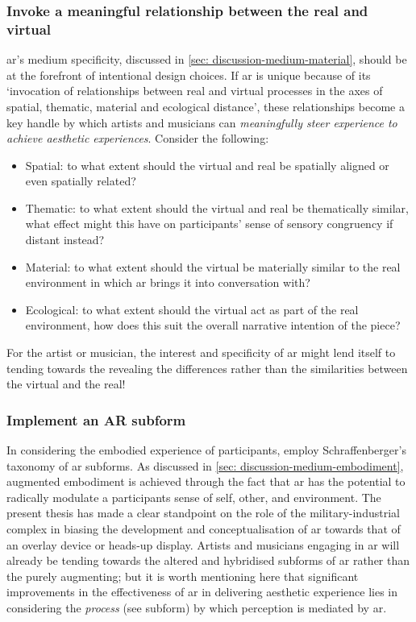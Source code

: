 \subsubsection{Invoke a meaningful relationship between the real and virtual}
\gls{ar}'s medium specificity, discussed in \autoref{sec: discussion-medium-material}, should be at the forefront of intentional design choices. If \gls{ar} is unique because of its `invocation of relationships between real and virtual processes in the axes of spatial, thematic, material and ecological distance', these relationships become a key handle by which artists and musicians can \textit{meaningfully steer experience to achieve aesthetic experiences}. Consider the following:
\begin{itemize}
    \item Spatial: to what extent should the virtual and real be spatially aligned or even spatially related?
    \item Thematic: to what extent should the virtual and real be thematically similar, what effect might this have on participants' sense of sensory congruency if distant instead?
    \item Material: to what extent should the virtual be materially similar to the real environment in which \gls{ar} brings it into conversation with? 
    \item Ecological: to what extent should the virtual act as part of the real environment, how does this suit the overall narrative intention of the piece?
\end{itemize}
For the artist or musician, the interest and specificity of \gls{ar} might lend itself to tending towards the revealing the differences rather than the similarities between the virtual and the real!

\subsubsection{Implement an AR subform}
In considering the embodied experience of participants, employ Schraffenberger's taxonomy of \gls{ar} subforms. As discussed in \autoref{sec: discussion-medium-embodiment}, augmented embodiment is achieved through the fact that \gls{ar} has the potential to radically modulate a participants sense of self, other, and environment. The present thesis has made a clear standpoint on the role of the military-industrial complex in biasing the development and conceptualisation of \gls{ar} towards that of an overlay device or heads-up display. Artists and musicians engaging in \gls{ar} will already be tending towards the altered and hybridised subforms of \gls{ar} rather than the purely augmenting; but it is worth mentioning here that significant improvements in the effectiveness of \gls{ar} in delivering aesthetic experience lies in considering the \textit{process} (see subform) by which perception is mediated by \gls{ar}.

